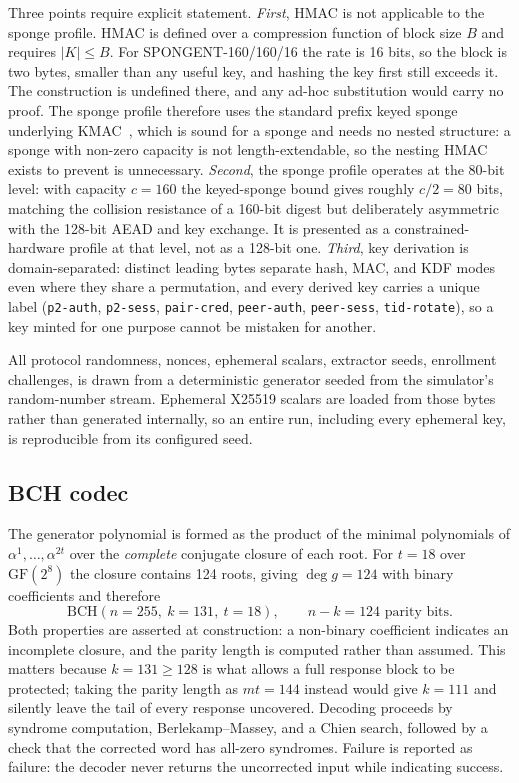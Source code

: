 \documentclass[journal]{IEEEtran}
\begin{document}
Three points require explicit statement. \emph{First}, HMAC is not applicable
to the sponge profile. HMAC is defined over a compression function of block
size $B$ and requires $|K| \le B$. For SPONGENT-160/160/16 the rate is 16 bits,
so the block is two bytes, smaller than any useful key, and hashing the key
first still exceeds it. The construction is undefined there, and any ad-hoc
substitution would carry no proof. The sponge profile therefore uses the
standard prefix keyed sponge underlying KMAC~\cite{sha3_standard}, which is
sound for a sponge and needs no nested structure: a sponge with non-zero
capacity is not length-extendable, so the nesting HMAC exists to prevent is
unnecessary. \emph{Second}, the sponge profile operates at the 80-bit level:
with capacity $c=160$ the keyed-sponge bound gives roughly $c/2 = 80$ bits,
matching the collision resistance of a 160-bit digest but deliberately
asymmetric with the 128-bit AEAD and key exchange. It is presented as a
constrained-hardware profile at that level, not as a 128-bit one. \emph{Third},
key derivation is domain-separated: distinct leading bytes separate hash, MAC,
and KDF modes even where they share a permutation, and every derived key
carries a unique label (\texttt{p2-auth}, \texttt{p2-sess},
\texttt{pair-cred}, \texttt{peer-auth}, \texttt{peer-sess},
\texttt{tid-rotate}), so a key minted for one purpose cannot be mistaken for
another.

All protocol randomness, nonces, ephemeral scalars, extractor seeds, enrollment
challenges, is drawn from a deterministic generator seeded from the simulator's
random-number stream. Ephemeral X25519 scalars are loaded from those bytes
rather than generated internally, so an entire run, including every ephemeral
key, is reproducible from its configured seed.

\subsection{BCH codec}
\label{sec:impl-bch}

The generator polynomial is formed as the product of the minimal polynomials of
$\alpha^1, \dots, \alpha^{2t}$ over the \emph{complete} conjugate closure of
each root. For $t=18$ over $\mathrm{GF}(2^8)$ the closure contains 124 roots,
giving $\deg g = 124$ with binary coefficients and therefore
\begin{equation}
\mathrm{BCH}(n{=}255,\ k{=}131,\ t{=}18), \qquad n-k = 124 \text{ parity bits}.
\end{equation}
Both properties are asserted at construction: a non-binary coefficient
indicates an incomplete closure, and the parity length is computed rather than
assumed. This matters because $k = 131 \ge 128$ is what allows a full response
block to be protected; taking the parity length as $mt = 144$ instead would give
$k = 111$ and silently leave the tail of every response uncovered. Decoding
proceeds by syndrome computation, Berlekamp--Massey, and a Chien search,
followed by a check that the corrected word has all-zero syndromes. Failure is
reported as failure: the decoder never returns the uncorrected input while
indicating success.
\end{document}
